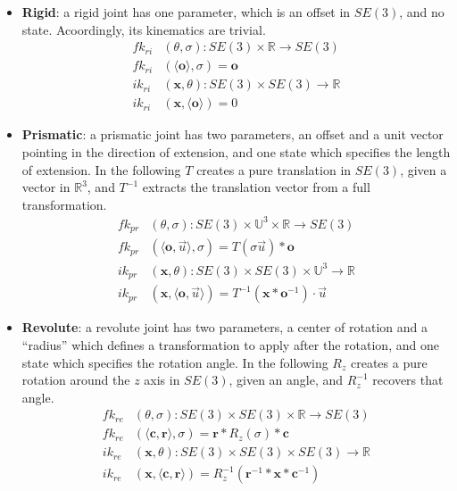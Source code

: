 \documentclass[letterpaper, 10 pt, conference]{ieeeconf}  %
\def\xvec{\vec}          \def\xvecstr{with an arrow}
\def\xse{\bm}            \def\xsestr{in boldface}
\begin{document}
\begin{itemize}
  \item \textbf{Rigid}: a rigid joint has one parameter, which is an offset in $SE(3)$, and no state. Acoordingly, its kinematics are trivial.
    \begin{align}
      fk_{ri}&(\theta, \sigma) : SE(3) \times \mathbb{R} \longrightarrow SE(3) \\
      fk_{ri}&(\langle \xse{o} \rangle, \sigma) = \xse{o} \nonumber\\
      ik_{ri}&(\xse{x}, \theta) : SE(3) \times SE(3) \longrightarrow \mathbb{R} \\
      ik_{ri}&(\xse{x}, \langle \xse{o} \rangle) = 0 \nonumber
    \end{align}
  \item \textbf{Prismatic}: a prismatic joint has two parameters, an offset and a unit vector pointing in the direction of extension, and one state which specifies the length of extension. In the following $T$ creates a pure translation in $SE(3)$, given a vector in $\mathbb{R}^3$, and $T^{-1}$ extracts the translation vector from a full transformation.
    \begin{align}
      fk_{pr}&(\theta, \sigma) : SE(3) \times \mathbb{U}^3 \times \mathbb{R} \longrightarrow SE(3) \\
      fk_{pr}&(\langle \xse{o}, \xvec{u} \rangle, \sigma) = T(\sigma \xvec{u}) * \xse{o} \nonumber\\
      ik_{pr}&(\xse{x}, \theta) : SE(3) \times SE(3) \times \mathbb{U}^3 \longrightarrow \mathbb{R} \\
      ik_{pr}&(\xse{x}, \langle \xse{o}, \xvec{u} \rangle) = T^{-1}(\xse{x}*\xse{o}^{-1}) \cdot \xvec{u} \nonumber
    \end{align}
  \item \textbf{Revolute}: a revolute joint has two parameters, a center of rotation and a ``radius'' which defines a transformation to apply after the rotation, and one state which specifies the rotation angle. In the following $R_z$ creates a pure rotation around the $z$ axis in $SE(3)$, given an angle, and $R_z^{-1}$ recovers that angle.
    \begin{align}
      fk_{re}&(\theta, \sigma) : SE(3) \times SE(3) \times \mathbb{R} \longrightarrow SE(3) \\
      fk_{re}&(\langle \xse{c}, \xse{r} \rangle, \sigma) = \xse{r} * R_z(\sigma) * \xse{c} \nonumber\\
      ik_{re}&(\xse{x}, \theta) : SE(3) \times SE(3) \times SE(3) \longrightarrow \mathbb{R} \\
      ik_{re}&(\xse{x}, \langle \xse{c}, \xse{r} \rangle) = R_z^{-1}(\xse{r}^{-1}*\xse{x}*\xse{c}^{-1}) \nonumber
    \end{align}
\end{itemize}
\end{document}

